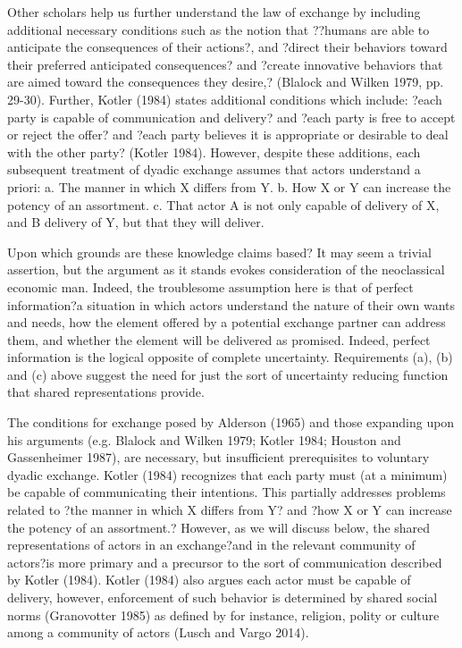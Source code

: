 Other scholars help us further understand the law of exchange by including additional necessary conditions such as the notion that ??humans are able to anticipate the consequences of their actions?, and ?direct their behaviors toward their preferred anticipated consequences? and ?create innovative behaviors that are aimed toward the consequences they desire,? (Blalock and Wilken 1979, pp. 29-30).  Further, Kotler (1984) states additional conditions which include: ?each party is capable of communication and delivery? and ?each party is free to accept or reject the offer? and ?each party believes it is appropriate or desirable to deal with the other party? (Kotler 1984). However, despite these additions, each subsequent treatment of dyadic exchange assumes that actors understand a priori: 
a.	The manner in which X differs from Y.
b.	How X or Y can increase the potency of an assortment.
c.	That actor A is not only capable of delivery of X, and B delivery of Y, but that they will deliver. 

Upon which grounds are these knowledge claims based? It may seem a trivial assertion, but the argument as it stands evokes consideration of the neoclassical economic man. Indeed, the troublesome assumption here is that of perfect information?a situation in which actors understand the nature of their own wants and needs, how the element offered by a potential exchange partner can address them, and whether the element will be delivered as promised. Indeed, perfect information is the logical opposite of complete uncertainty. Requirements (a), (b) and (c) above suggest the need for just the sort of uncertainty reducing function that shared representations provide. 

The conditions for exchange posed by Alderson (1965) and those expanding upon his arguments (e.g. Blalock and Wilken 1979; Kotler 1984; Houston and Gassenheimer 1987), are necessary, but insufficient prerequisites to voluntary dyadic exchange.   Kotler (1984) recognizes that each party must (at a minimum) be capable of communicating their intentions. This partially addresses problems related to ?the manner in which X differs from Y? and ?how X or Y can increase the potency of an assortment.? However, as we will discuss below, the shared representations of actors in an exchange?and in the relevant community of actors?is more primary and a precursor to the sort of communication described by Kotler (1984). Kotler (1984) also argues each actor must be capable of delivery, however, enforcement of such behavior is determined by shared social norms (Granovotter 1985) as defined by for instance, religion, polity or culture among a community of actors (Lusch and Vargo 2014). 

